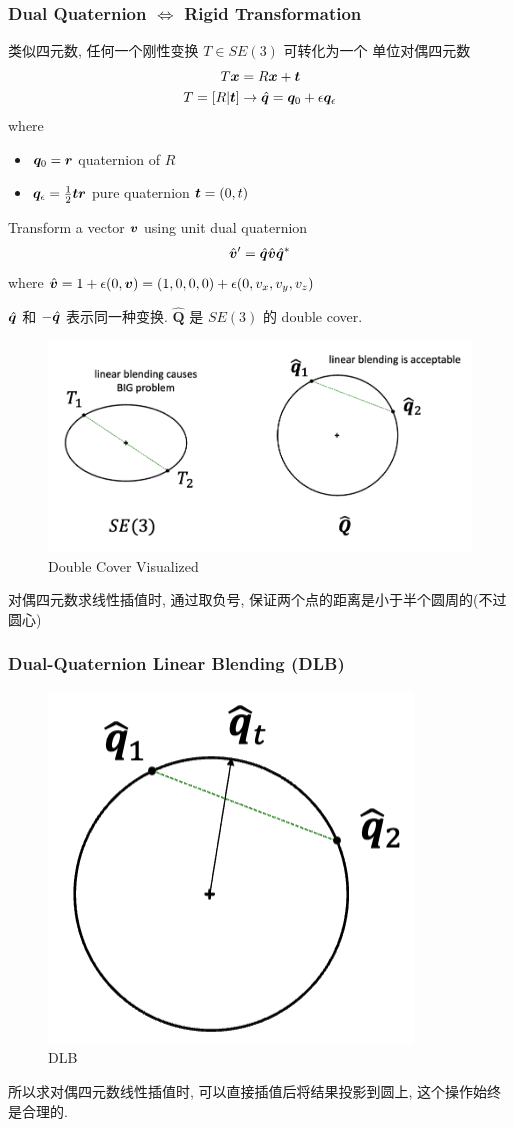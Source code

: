 \subsubsection{Dual Quaternion \texorpdfstring{$\iff$}.  Rigid Transformation}
类似四元数, 任何一个刚性变换 $T\in SE(3)$ 可转化为一个 单位对偶四元数
\begin{align*}
    T{\bm{x}} &= R{\bm{x}} + {\bm{t}}\\
    T = [R|{\bm{t}}] &\to \hat{{\bm{q}}} = {\bm{q}}_0+\epsilon{\bm{q}}_\epsilon
\end{align*}
where
\begin{itemize}
    \item ${\bm{q}}_0 = {\bm{r}}$ quaternion of $R$
    \item ${\bm{q}}_\epsilon=\frac{1}{2}{\bm{t}} {\bm{r}}$ pure quaternion ${\bm{t}} = (0, t)$
\end{itemize}

Transform a vector ${\bm{v}}$ using unit dual quaternion
\begin{align*}
    \hat{{\bm{v}}}' = \hat{{\bm{q}}}\hat{{\bm{v}}}\hat{{\bm{q}}}^*
\end{align*}
where $\hat{{\bm{v}}} = 1+ \epsilon (0, {\bm{v}}) = (1, 0, 0, 0) + \epsilon (0, v_x, v_y, v_z)$

$\hat{{\bm{q}}}$ 和 $-\hat{{\bm{q}}}$ 表示同一种变换. $\hat{\bm Q}$ 是 $SE(3)$ 的 double cover. 

\begin{figure}[!htb]
    \centering
    \includegraphics[width=0.88\linewidth]{pic/1057/Double Cover Visualized}
    \caption{Double Cover Visualized}
\end{figure}
对偶四元数求线性插值时, 通过取负号, 保证两个点的距离是小于半个圆周的(不过圆心)

\subsubsection{Dual-Quaternion Linear Blending (DLB)}
\begin{figure}[!htb]
    \centering
    \includegraphics[width=0.42\linewidth]{pic/1057/DLB.png}
    \caption{DLB}
\end{figure}
所以求对偶四元数线性插值时, 可以直接插值后将结果投影到圆上, 这个操作始终是合理的. 

